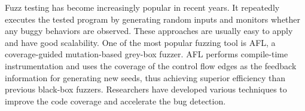 

Fuzz testing has become increasingly popular in recent years. It repeatedly executes the tested program by generating random inputs and monitors whether any buggy behaviors are observed. These approaches are usually easy to apply and have good scalability. One of the most popular fuzzing tool is AFL\cite{afl}, a coverage-guided mutation-based grey-box fuzzer. AFL performs compile-time instrumentation and uses the coverage of the control flow edges as the feedback information for generating new seeds, thus achieving superior efficiency than previous black-box fuzzers. Researchers have developed various techniques to improve the code coverage and accelerate the bug detection. 

